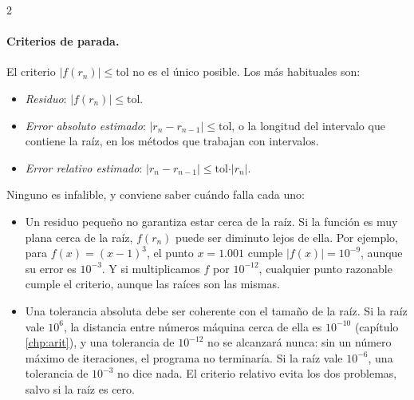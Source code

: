 \begin{paracol}{2}
\paragraph*{Criterios de parada.}\label{par:parada} El criterio $\vert f(r_n)\vert\leq\text{tol}$ no es el único posible. Los más habituales son:
\begin{itemize}
\item \emph{Residuo}: $\vert f(r_n)\vert\leq \text{tol}$.
\item \emph{Error absoluto estimado}: $\vert r_n-r_{n-1}\vert\leq \text{tol}$, o la longitud del intervalo que contiene la raíz, en los métodos que trabajan con intervalos.
\item \emph{Error relativo estimado}: $\vert r_n-r_{n-1}\vert\leq \text{tol}\cdot\vert r_n\vert$.
\end{itemize}
Ninguno es infalible, y conviene saber cuándo falla cada uno:
\begin{itemize}
\item Un residuo pequeño no garantiza estar cerca de la raíz. Si la función es muy plana cerca de la raíz, $f(r_n)$ puede ser diminuto lejos de ella. Por ejemplo, para $f(x)=(x-1)^3$, el punto $x=1.001$ cumple $\vert f(x)\vert=10^{-9}$, aunque su error es $10^{-3}$. Y si multiplicamos $f$ por $10^{-12}$, cualquier punto razonable cumple el criterio, aunque las raíces son las mismas.
\item Una tolerancia absoluta debe ser coherente con el tamaño de la raíz. Si la raíz vale $10^{6}$, la distancia entre números máquina cerca de ella es $10^{-10}$ (capítulo \ref{chp:arit}), y una tolerancia de $10^{-12}$ no se alcanzará nunca: sin un número máximo de iteraciones, el programa no terminaría. Si la raíz vale $10^{-6}$, una tolerancia de $10^{-3}$ no dice nada. El criterio relativo evita los dos problemas, salvo si la raíz es cero.
\end{itemize}
\switchcolumn

\end{paracol}
